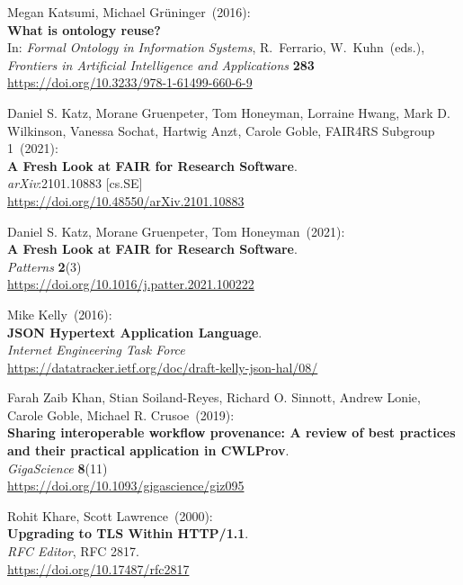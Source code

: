 \begin{thebibliography}{9}
Megan Katsumi, Michael Grüninger~(2016): \\
\textbf{What is ontology reuse?}\\
In: \emph{Formal Ontology in Information Systems}, R.~Ferrario, 
W.~Kuhn~(eds.),\\
\emph{Frontiers in Artificial Intelligence and Applications}
\textbf{283}\\
\url{https://doi.org/10.3233/978-1-61499-660-6-9}

Daniel S. Katz, Morane Gruenpeter, Tom Honeyman, Lorraine Hwang, Mark D. Wilkinson, Vanessa Sochat, Hartwig Anzt, Carole Goble, FAIR4RS Subgroup 1~(2021): \\
\textbf{A Fresh Look at FAIR for Research Software}.\\
\emph{arXiv}:2101.10883 [cs.SE] \\
\url{https://doi.org/10.48550/arXiv.2101.10883}

Daniel S. Katz, Morane Gruenpeter, Tom Honeyman~(2021): \\
\textbf{A Fresh Look at FAIR for Research Software}.\\
\emph{Patterns} \textbf{2}(3) \\
\url{https://doi.org/10.1016/j.patter.2021.100222}

Mike Kelly~(2016): \\
\textbf{JSON Hypertext Application Language}.\\
\emph{Internet Engineering Task Force}\\
\url{https://datatracker.ietf.org/doc/draft-kelly-json-hal/08/}

Farah Zaib Khan, Stian Soiland-Reyes, Richard O. Sinnott, Andrew Lonie, Carole Goble, Michael R. Crusoe~(2019): \\
\textbf{Sharing interoperable workflow provenance: A review of best practices and their practical application in CWLProv}.\\
\emph{GigaScience} \textbf{8}(11)\\
\url{https://doi.org/10.1093/gigascience/giz095}

Rohit Khare, Scott Lawrence~(2000): \\
\textbf{Upgrading to {TLS Within HTTP}/1.1}.\\
\emph{RFC Editor}, RFC 2817. \\
\url{https://doi.org/10.17487/rfc2817}


\end{thebibliography}
